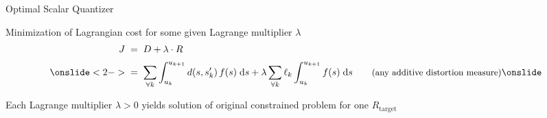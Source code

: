 

\begin{frame}{Optimal Scalar Quantizer}
  \bit
\item Minimization of Lagrangian cost for some given Lagrange multiplier $\lambda$
  \vspace{-1ex}\begin{align*}
    J
    &\;=\;D+\lambda\cdot R\\[.5ex]
    \onslide<2->
    &\;=\;
    \sum_{\forall k}\int_{u_k}^{u_{k+1}}d(s,s'_k)\,f(s)\;\d s
    +
    \lambda
    \sum_{\forall k}\ell_k\int_{u_k}^{u_{k+1}}f(s)\;\d s
    &&\quad\text{\small(any additive distortion measure)}
    \onslide
  \end{align*}
  \item<3->[\iarrow] Each Lagrange multiplier $\lambda>0$ yields solution of original constrained problem for one $R_{\text{target}}$
  \eit

  \medskip
  \vspace {-5ex}
\end{frame}


